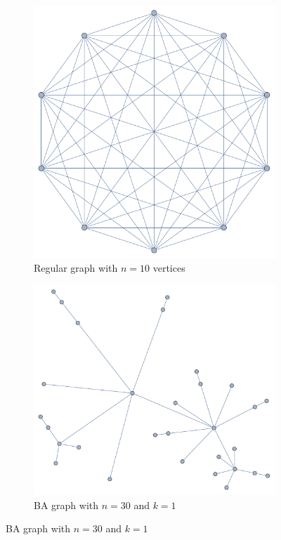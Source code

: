 \documentclass[english, twoside, 12pt, a4paper]{article}
\theoremstyle{definition}
\theoremstyle{plain}
\theoremstyle{remark}
\begin{document}
 \begin{figure}[hbt]
  \centering
  \begin{subfigure}[t]{0.40\textwidth}
    \includegraphics[width=\textwidth]{../ramsza/figs/graph_complete.pdf}
    \caption{Regular graph with \(n = 10\) vertices}
    \label{fig:graphsa}
  \end{subfigure}
  \hfill
  \begin{subfigure}[t]{0.40\textwidth}
    \includegraphics[width=\textwidth]{../ramsza/figs/graph_ba.pdf}
    \caption{BA graph with \( n = 30 \) and \( k = 1\)}
    \label{fig:graphsb}
  \end{subfigure}
  

\end{figure}
\end{document}
